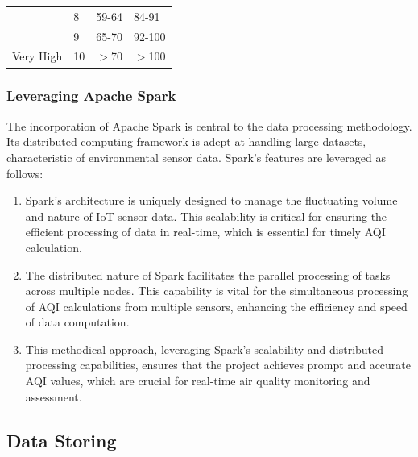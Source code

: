 \documentclass[12pt,oneside]{book} %
\begin{document}
\begin{table}[H]
\begin{tabular}{|p{2cm}|p{2cm}|p{}|p{}|}
                       & 8                          & 59-64                                                         & 84-91                                                        \\
                       & 9                          & 65-70                                                         & 92-100                                                       \\ \hline
        Very High      & 10                         & $>$70                                                         & $>$100                                                       \\ \hline
    \end{tabular}
    \label{tab:uk_aqi}
\end{table}

\subsubsection{Leveraging Apache Spark}
The incorporation of Apache Spark is central to the data processing
methodology. Its distributed computing framework is adept at handling large
datasets, characteristic of environmental sensor data. Spark's features are
leveraged as follows:

\begin{enumerate}
    \item Spark's architecture is uniquely designed to manage the fluctuating volume and
          nature of IoT sensor data. This scalability is critical for ensuring the
          efficient processing of data in real-time, which is essential for timely AQI
          calculation.

    \item The distributed nature of Spark facilitates the parallel processing of tasks
          across multiple nodes. This capability is vital for the simultaneous processing
          of AQI calculations from multiple sensors, enhancing the efficiency and speed
          of data computation.

    \item This methodical approach, leveraging Spark's scalability and distributed
          processing capabilities, ensures that the project achieves prompt and accurate
          AQI values, which are crucial for real-time air quality monitoring and
          assessment.
\end{enumerate}

\subsection{Data Storing}
\end{document}
